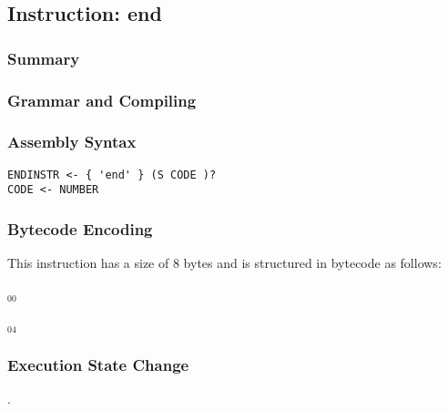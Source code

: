 \subsection{Instruction: end}

\subsubsection{Summary}


\subsubsection{Grammar and Compiling}


\subsubsection{Assembly Syntax}

\begin{myquote}
\begin{verbatim}
ENDINSTR <- { 'end' } (S CODE )? 
CODE <- NUMBER
\end{verbatim}
\end{myquote}

\subsubsection{Bytecode Encoding}

This instruction has a size of 8 bytes and is structured in bytecode as follows:

$_{00}$\ 



$_{04}$\ 


\subsubsection{Execution State Change}

.



